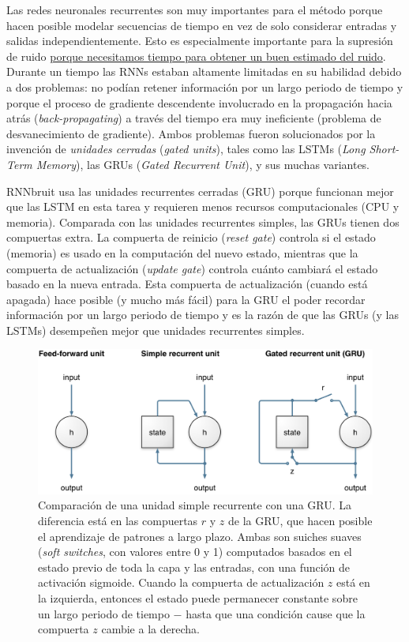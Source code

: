 \documentclass[conference,onecolumn]{IEEEtran}
\begin{document}
Las redes neuronales recurrentes son muy importantes para el método porque hacen posible modelar secuencias de tiempo en vez de solo considerar entradas y salidas independientemente. Esto es especialmente importante para la supresión de ruido \underline{porque necesitamos tiempo para obtener un buen estimado del ruido}. Durante un tiempo las RNNs estaban altamente limitadas en su habilidad debido a dos problemas: no podían retener información por un largo periodo de tiempo y porque el proceso de gradiente descendente involucrado en la propagación hacia atrás (\textit{back-propagating}) a través del tiempo era muy ineficiente (problema de desvanecimiento de gradiente). Ambos problemas fueron solucionados por la invención de \textit{unidades cerradas} (\textit{gated units}), tales como las LSTMs (\textit{Long Short-Term Memory}), las GRUs (\textit{Gated Recurrent Unit}), y sus muchas variantes.


RNNbruit usa las unidades recurrentes cerradas (GRU) porque funcionan mejor que las LSTM en esta tarea y requieren menos recursos computacionales (CPU y memoria). Comparada con las unidades recurrentes simples, las GRUs tienen dos compuertas extra. La compuerta de reinicio (\textit{reset gate}) controla si el estado (memoria) es usado en la computación del nuevo estado, mientras que la compuerta de actualización (\textit{update gate}) controla cuánto cambiará el estado basado en la nueva entrada. Esta compuerta de actualización (cuando está apagada) hace posible (y mucho más fácil) para la GRU el poder recordar información por un largo periodo de tiempo y es la razón de que las GRUs (y las LSTMs) desempeñen mejor que unidades recurrentes simples.

 \begin{figure}[H]
 \centering
    \includegraphics[scale=0.7]{simple_vs_gru.png}
    \caption{Comparación de una unidad simple recurrente con una GRU. La diferencia está en las compuertas $r$ y $z$ de la GRU, que hacen posible el aprendizaje de patrones a largo plazo. Ambas son suiches suaves (\textit{soft switches}, con valores entre 0 y 1) computados basados en el estado previo de toda la capa y las entradas, con una función de activación sigmoide. Cuando la compuerta de actualización $z$ está en la izquierda, entonces el estado puede permanecer constante sobre un largo periodo de tiempo $-$ hasta que una condición cause que la compuerta $z$ cambie a la derecha.} 
\end{figure}
\end{document}
